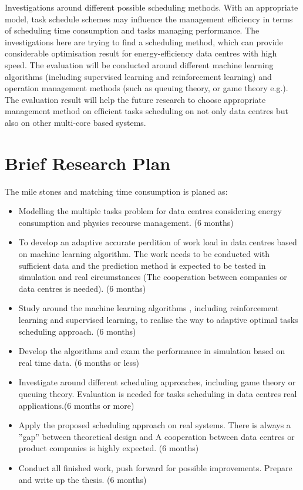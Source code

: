 \documentclass[11pt]{article}
\begin{document}
\begin{itemize}
Investigations around different possible scheduling methods. With an appropriate model, task schedule schemes may influence the management efficiency in terms of scheduling time consumption and tasks managing performance. The investigations here are trying to find a scheduling method, which can provide considerable optimisation result for energy-efficiency data centres with high speed. The evaluation will be conducted around different machine learning algorithms (including supervised learning and reinforcement learning) and operation management methods (such as queuing theory, or game theory e.g.\cite{game}). The evaluation result will help the future research to choose appropriate management method on efficient tasks scheduling on not only data centres but also on other multi-core based systems. 
\end{itemize}


\section{Brief Research Plan}\label{sec:timetable}
The mile stones and matching time consumption is planed as:
\begin{itemize}
\item
Modelling the multiple tasks problem for data centres considering energy consumption and physics recourse management. (6 months)
\item
To develop an adaptive accurate perdition of work load in data centres based on machine learning algorithm. The work needs to be conducted with sufficient data and the prediction method is expected to be tested in simulation and real circumstances (The cooperation between companies or data centres is needed). (6 months)
\item
Study around the machine learning algorithms \cite{ma}, including reinforcement learning and supervised learning, to realise the way to adaptive optimal tasks scheduling approach. (6 months)
\item
Develop the algorithms and exam the performance in simulation based on real time data. (6 months or less)
\item
Investigate around different scheduling approaches, including game theory or queuing theory. Evaluation is needed for tasks scheduling in data centres real applications.(6 months or more)
\item
Apply the proposed scheduling approach on real systems. There is always a ”gap” between theoretical design and A cooperation between data centres or product companies is highly expected. (6 months)
\item
Conduct all finished work, push forward for possible improvements. Prepare and write up the thesis. (6 months)
\end{itemize}
\end{document}
